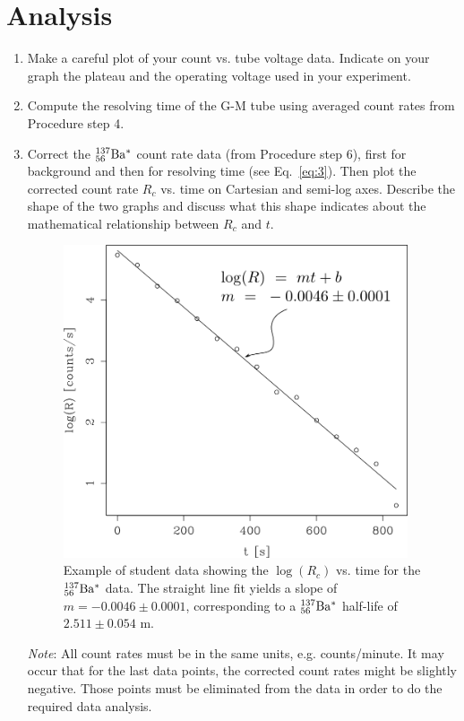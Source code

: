 \documentclass{article}
\newcommand{\bam}{${}^{137}_{56}{\rm Ba^* }$ }
\begin{document}
\section{Analysis}

\begin{enumerate}
\item Make a careful plot of your count vs. tube voltage data.
Indicate on your graph the plateau and the operating voltage used in
your experiment.

\item Compute the resolving time of the G-M tube using averaged count
rates from Procedure step 4.

\item Correct the \bam count rate data (from Procedure step 6), first
for background and then for resolving time (see Eq.~\ref{eq:3}).  Then plot
the corrected count rate $R_{c}$ vs. time on
Cartesian and semi-log axes.  Describe the shape of the two graphs
and discuss what this shape indicates about the mathematical
relationship between $R_{c}$ and $t$.
\begin{figure}
\begin{centering}
\includegraphics[width=4in]{images/ba137m.png}
\caption{Example of student data showing the $\log(R_c)$ vs. time for the \bam data.  The straight line fit yields a slope of $m=-0.0046\pm0.0001$, corresponding to a \bam half-life of $2.511\pm0.054$ m. }
\label{fig:rate-V}
\end{centering}
\end{figure}

{\em Note}: All count rates must be in the same units, e.g. counts/minute. 
It may occur that for the last data points, the corrected count
rates might be slightly negative.  Those points must be eliminated
from the data in order to do the required data analysis.


\end{enumerate}
\end{document}

